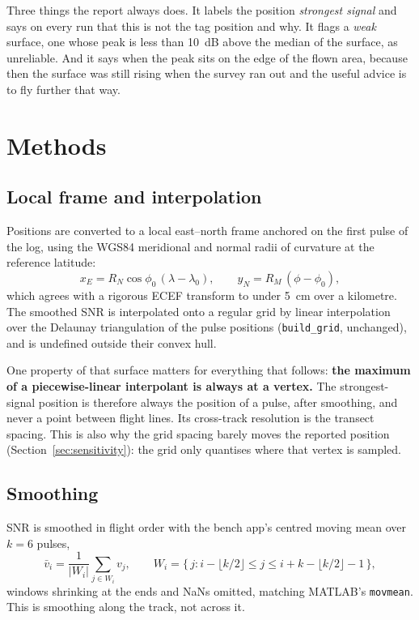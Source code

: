 \documentclass[11pt,a4paper]{article}
\newcommand{\code}[1]{\texttt{\small #1}}
\begin{document}
Three things the report always does. It labels the position \emph{strongest signal} and
says on every run that this is not the tag position and why. It flags a \emph{weak} surface,
one whose peak is less than \SI{10}{dB} above the median of the surface, as unreliable. And it
says when the peak sits on the edge of the flown area, because then the surface was still
rising when the survey ran out and the useful advice is to fly further that way.

\section{Methods}

\subsection{Local frame and interpolation}

Positions are converted to a local east--north frame anchored on the first pulse of the log,
using the WGS84 meridional and normal radii of curvature at the reference latitude:
\begin{equation}
x_E = R_N \cos\phi_0\,(\lambda-\lambda_0), \qquad y_N = R_M\,(\phi-\phi_0),
\end{equation}
which agrees with a rigorous ECEF transform to under \SI{5}{cm} over a kilometre. The
smoothed SNR is interpolated onto a regular grid by linear interpolation over the Delaunay
triangulation of the pulse positions (\code{build\_grid}, unchanged), and is undefined outside
their convex hull.

One property of that surface matters for everything that follows: \textbf{the maximum of a
piecewise-linear interpolant is always at a vertex.} The strongest-signal position is
therefore always the position of a pulse, after smoothing, and never a point between flight
lines. Its cross-track resolution is the transect spacing. This is also why the grid spacing
barely moves the reported position (Section~\ref{sec:sensitivity}): the grid only quantises
where that vertex is sampled.

\subsection{Smoothing}

SNR is smoothed in flight order with the bench app's centred moving mean over $k=6$ pulses,
\begin{equation}
\bar v_i = \frac{1}{|W_i|}\sum_{j\in W_i} v_j, \qquad
W_i = \{\,j : i-\lfloor k/2\rfloor \le j \le i + k - \lfloor k/2\rfloor - 1\,\},
\end{equation}
windows shrinking at the ends and NaNs omitted, matching MATLAB's \code{movmean}. This is
smoothing along the track, not across it.
\end{document}
